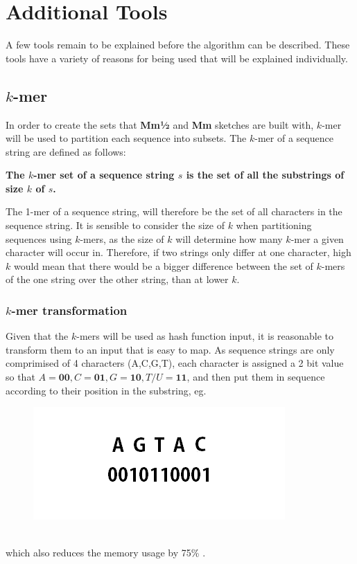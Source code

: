 \documentclass[../../main.tex]{subfiles}
\begin{document}
\section{Additional Tools}
A few tools remain to be explained before the algorithm can be described. These tools have a variety of reasons for being used that will be explained individually. 
\subsection{$k$-mer}
In order to create the sets that {\bf Mm½} and {\bf Mm} sketches are built with, $k$-mer will be used to partition each sequence into subsets. The $k$-mer of a sequence string are defined as follows:
\begin{center}
{\bf The $k$-mer set of a sequence string $s$ is the set of all the substrings of size $k$ of $s$.}
\end{center}
The 1-mer of a sequence string, will therefore be the set of all characters in the sequence string. It is sensible to consider the size of $k$ when partitioning sequences using $k$-mers, as the size of $k$ will determine how many $k$-mer a given character will occur in. Therefore, if two strings only differ at one character, high $k$ would mean that there would be a bigger difference between the set of $k$-mers of the one string over the other string, than at lower $k$.
\subsubsection{$k$-mer transformation}
\label{sec:kmertransformation}

Given that the $k$-mers will be used as hash function input, it is reasonable to transform them to an input that is easy to map. As sequence strings are only comprimised of 4 characters (A,C,G,T), each character is assigned a 2 bit value so that $A=\mathbf{00},C=\mathbf{01},G=\mathbf{10},T/U=\mathbf{11}$, and then put them in sequence according to their position in the substring, eg.
\begin{figure}[h]
\includegraphics[scale=0.4]{fig/kmertransformed}
\end{figure}\\
which also reduces the memory usage by 75\% .
\end{document}
